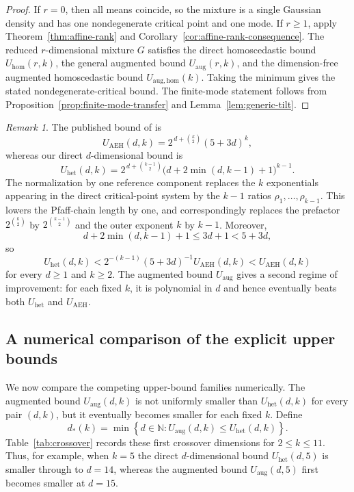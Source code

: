 \documentclass[11pt]{article}
\theoremstyle{plain}
\theoremstyle{definition}
\theoremstyle{remark}
\newtheorem{remark}[theorem]{Remark}
\numberwithin{equation}{section}
\begin{document}
\begin{proof}
If $r=0$, then all means coincide, so the mixture is a single Gaussian density and has one nondegenerate critical point and one mode. If $r\ge1$, apply Theorem~\ref{thm:affine-rank} and Corollary~\ref{cor:affine-rank-consequence}. The reduced $r$-dimensional mixture $G$ satisfies the direct homoscedastic bound $U_{\mathrm{hom}}(r,k)$, the general augmented bound $U_{\mathrm{aug}}(r,k)$, and the dimension-free augmented homoscedastic bound $U_{\mathrm{aug,hom}}(k)$. Taking the minimum gives the stated nondegenerate-critical bound. The finite-mode statement follows from Proposition~\ref{prop:finite-mode-transfer} and Lemma~\ref{lem:generic-tilt}.
\end{proof}

\begin{remark}\label{rem:comparison-aeh}
The published bound of \citet{AmendolaEngstromHaase2019} is
\[
U_{\mathrm{AEH}}(d,k)=2^{\,d+\binom{k}{2}}(5+3d)^k,
\]
whereas our direct $d$-dimensional bound is
\[
U_{\mathrm{het}}(d,k)=2^{\,d+\binom{k-1}{2}}\bigl(d+2\min(d,k-1)+1\bigr)^{k-1}.
\]
The normalization by one reference component replaces the $k$ exponentials appearing in the direct critical-point system by the $k-1$ ratios $\rho_1,\dots,\rho_{k-1}$. This lowers the Pfaff-chain length by one, and correspondingly replaces the prefactor $2^{\binom{k}{2}}$ by $2^{\binom{k-1}{2}}$ and the outer exponent $k$ by $k-1$. Moreover,
\[
d+2\min(d,k-1)+1\le 3d+1<5+3d,
\]
so
\[
U_{\mathrm{het}}(d,k)<2^{-(k-1)}(5+3d)^{-1}U_{\mathrm{AEH}}(d,k)<U_{\mathrm{AEH}}(d,k)
\]
for every $d\ge 1$ and $k\ge 2$. The augmented bound $U_{\mathrm{aug}}$ gives a second regime of improvement: for each fixed $k$, it is polynomial in $d$ and hence eventually beats both $U_{\mathrm{het}}$ and $U_{\mathrm{AEH}}$.
\end{remark}

\subsection{A numerical comparison of the explicit upper bounds}\label{subsec:upper-numerical-comparison}

We now compare the competing upper-bound families numerically. The augmented bound $U_{\mathrm{aug}}(d,k)$ is not uniformly smaller than $U_{\mathrm{het}}(d,k)$ for every pair $(d,k)$, but it eventually becomes smaller for each fixed $k$. Define
\[
d_\ast(k)=\min\left\{d\in\mathbb N: U_{\mathrm{aug}}(d,k)\le U_{\mathrm{het}}(d,k)\right\}.
\]
Table~\ref{tab:crossover} records these first crossover dimensions for $2\le k\le 11$. Thus, for example, when $k=5$ the direct $d$-dimensional bound $U_{\mathrm{het}}(d,5)$ is smaller through to $d=14$, whereas the augmented bound $U_{\mathrm{aug}}(d,5)$ first becomes smaller at $d=15$.
\end{document}
